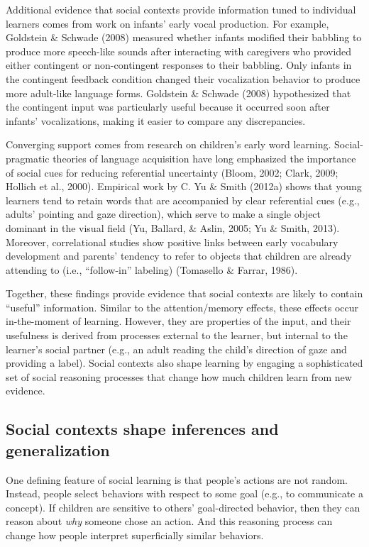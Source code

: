 \documentclass[oneside]{report}
\begin{document}
Additional evidence that social contexts provide information tuned to
individual learners comes from work on infants' early vocal production.
For example, Goldstein \& Schwade (2008) measured whether infants
modified their babbling to produce more speech-like sounds after
interacting with caregivers who provided either contingent or
non-contingent responses to their babbling. Only infants in the
contingent feedback condition changed their vocalization behavior to
produce more adult-like language forms. Goldstein \& Schwade (2008)
hypothesized that the contingent input was particularly useful because
it occurred soon after infants' vocalizations, making it easier to
compare any discrepancies.

Converging support comes from research on children's early word
learning. Social-pragmatic theories of language acquisition have long
emphasized the importance of social cues for reducing referential
uncertainty (Bloom, 2002; Clark, 2009; Hollich et al., 2000). Empirical
work by C. Yu \& Smith (2012a) shows that young learners tend to retain
words that are accompanied by clear referential cues (e.g., adults'
pointing and gaze direction), which serve to make a single object
dominant in the visual field (Yu, Ballard, \& Aslin, 2005; Yu \& Smith,
2013). Moreover, correlational studies show positive links between early
vocabulary development and parents' tendency to refer to objects that
children are already attending to (i.e., ``follow-in'' labeling)
(Tomasello \& Farrar, 1986).

Together, these findings provide evidence that social contexts are
likely to contain ``useful'' information. Similar to the
attention/memory effects, these effects occur in-the-moment of learning.
However, they are properties of the input, and their usefulness is
derived from processes external to the learner, but internal to the
learner's social partner (e.g., an adult reading the child's direction
of gaze and providing a label). Social contexts also shape learning by
engaging a sophisticated set of social reasoning processes that change
how much children learn from new evidence.

\hypertarget{social-contexts-shape-inferences-and-generalization}{%
\subsection{Social contexts shape inferences and
generalization}\label{social-contexts-shape-inferences-and-generalization}}

One defining feature of social learning is that people's actions are not
random. Instead, people select behaviors with respect to some goal
(e.g., to communicate a concept). If children are sensitive to others'
goal-directed behavior, then they can reason about \emph{why} someone
chose an action. And this reasoning process can change how people
interpret superficially similar behaviors.
\end{document}
